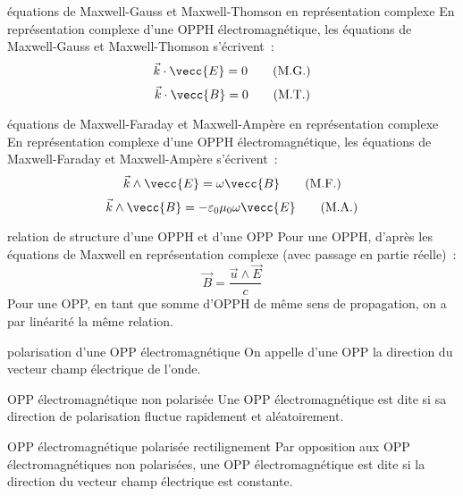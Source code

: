 \begin{theoreme}{}{équations de Maxwell-Gauss et Maxwell-Thomson en représentation complexe}
    En représentation complexe d'une OPPH électromagnétique, les équations de Maxwell-Gauss et Maxwell-Thomson s'écrivent~:
    $$\vec{k} \cdot \vecc{E} = 0 \qquad \text{(M.G.)}$$
    $$\vec{k} \cdot \vecc{B} = 0 \qquad \text{(M.T.)}$$
\end{theoreme}

\begin{theoreme}{}{équations de Maxwell-Faraday et Maxwell-Ampère en représentation complexe}
    En représentation complexe d'une OPPH électromagnétique, les équations de Maxwell-Faraday et Maxwell-Ampère s'écrivent~:
    $$\vec{k} \wedge \vecc{E} = \omega \vecc{B} \qquad \text{(M.F.)}$$
    $$\vec{k} \wedge \vecc{B} = - \varepsilon_0 \mu_0 \omega \vecc{E} \qquad \text{(M.A.)}$$
\end{theoreme}

\begin{theoreme}{}{relation de structure d'une OPPH et d'une OPP}
    Pour une OPPH, d'après les équations de Maxwell en représentation complexe (avec passage en partie réelle)~:
    $$\vec{B} = \frac{\vec{u} \wedge \vec{E}}{c}$$
    Pour une OPP, en tant que somme d'OPPH de même sens de propagation, on a par linéarité la même relation.
\end{theoreme}

\begin{definition}{}{polarisation d'une OPP électromagnétique}
    On appelle  d'une OPP la direction du vecteur champ électrique de l'onde.
\end{definition}

\begin{definition}{}{OPP électromagnétique non polarisée}
    Une OPP électromagnétique est dite  si sa direction de polarisation fluctue rapidement et aléatoirement.
\end{definition}

\begin{definition}{}{OPP électromagnétique polarisée rectilignement}
    Par opposition aux OPP électromagnétiques non polarisées, une OPP électromagnétique est dite  si la direction du vecteur champ électrique est constante.
\end{definition}


